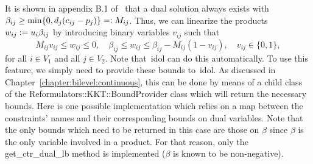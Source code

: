 It is shown in appendix B.1 of~\textcite{Cheng2021} that a dual solution
always exists with $\beta_{ij} \ge \min\{ 0, d_j(c_{ij} - p_j) \} \mathrel{{=}{\mathop:}}
M_{ij}$. Thus, we can linearize the products $w_{ij} \mathrel{{\mathop:}{=}} u_i\beta_{ij}$ by
introducing binary variables $v_{ij}$ such that 
\begin{equation}
    M_{ij}v_{ij} \le w_{ij} \le 0, \quad 
    \beta_{ij} \le w_{ij} \le \beta_{ij} - M_{ij}(1 - v_{ij}), \quad 
    v_{ij} \in \{0,1\},
    \label{eq:ccg:uflp:dual:mccormick}
\end{equation}
for all $i\in V_1$ and all $j\in V_2$. Note that~\textsf{idol} can do this
automatically. To use this feature, we simply need to provide these bounds
to~\textsf{idol}. As discussed in Chapter~\ref{chapter:bilevel:continuous},
this can be done by means of a child class of the
\textsf{Reformulators::KKT::BoundProvider} class which will return the
necessary bounds. Here is one possible implementation which relies on a map
between the constraints' names and their corresponding bounds on dual
variables. Note that the only bounds which need to be returned in this case
are those on $\beta$ since $\beta$ is the only variable involved in a product.
For that reason, only the \textsf{get\_ctr\_dual\_lb} method is implemented
($\beta$ is known to be non-negative).
%
